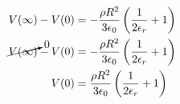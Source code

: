 \documentclass[11pt]{article}
\numberwithin{equation}{section}
\begin{document}
\begin{align*}
V(\infty) -V(0)&= -\dfrac{\rho R^2}{3\epsilon_0}\left(\frac{1}{2\epsilon_r} + 1\right) \\
\cancelto{0}{V(\infty)} -V(0)&= -\dfrac{\rho R^2}{3\epsilon_0}\left(\frac{1}{2\epsilon_r} + 1\right) \\
V(0)&= \dfrac{\rho R^2}{3\epsilon_0}\left(\frac{1}{2\epsilon_r} + 1\right) \\
\end{align*}
\end{document}
